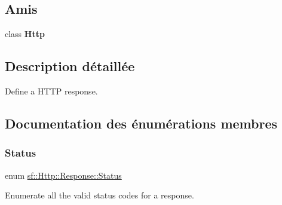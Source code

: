 \subsection*{Amis}
\begin{DoxyCompactItemize}
\item 
\mbox{\label{classsf_1_1Http_1_1Response_aba95e2a7762bb5df986048b05d03a22e}} 
class {\bfseries Http}
\end{DoxyCompactItemize}


\subsection{Description détaillée}
Define a H\+T\+TP response. 

\subsection{Documentation des énumérations membres}
\mbox{\label{classsf_1_1Http_1_1Response_a663e071978e30fbbeb20ed045be874d8}} 
\subsubsection{\texorpdfstring{Status}{Status}}
{\footnotesize\ttfamily enum \hyperlink{classsf_1_1Http_1_1Response_a663e071978e30fbbeb20ed045be874d8}{sf\+::\+Http\+::\+Response\+::\+Status}}



Enumerate all the valid status codes for a response. 

